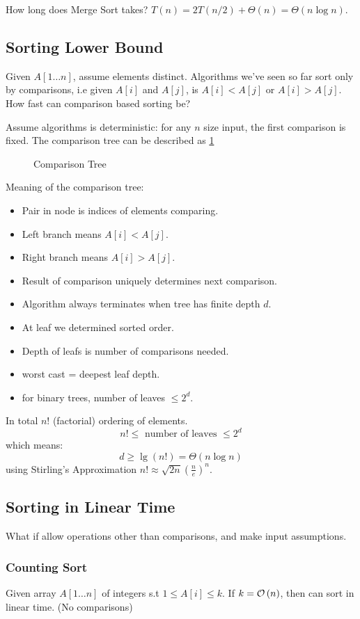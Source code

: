 How long does Merge Sort takes?
$T(n) = 2T(n/2) + \Theta(n) = \Theta(n \log n)$.

\subsection{Sorting Lower Bound}
Given $A[1 \ldots n]$, assume elements distinct.
Algorithms we've seen so far sort only by comparisons,
i.e given $A[i]$ and $A[j]$, is $A[i] < A[j]$ or $A[i] > A[j]$.
How fast can comparison based sorting be?

Assume algorithms is deterministic: for any $n$ size input,
the first comparison is fixed.
The comparison tree can be described as \cref{fig:sortinglowerbound}

\begin{figure}[H]
    \caption{Comparison Tree}\label{fig:sortinglowerbound}
\end{figure}

Meaning of the comparison tree:
\begin{itemize}
    \item Pair in node is indices of elements comparing.
    \item Left branch means $A[i] < A[j]$.
    \item Right branch means $A[i] > A[j]$.
    \item Result of comparison uniquely determines next comparison.
    \item Algorithm always terminates when tree has finite depth $d$.
    \item At leaf we determined sorted order.
    \item Depth of leafs is number of comparisons needed.
    \item worst cast = deepest leaf depth.
    \item for binary trees, number of leaves $\leq 2^d$.
\end{itemize}
In total $n!$ (factorial) ordering of elements.
\[n! \leq \text{ number of leaves } \leq 2^d\]
which means:
\[d \geq \lg(n!) = \Theta(n \log n)\]
using Stirling's Approximation $n! \approx \sqrt{2n}\left(\frac{n}{e}\right)^n$.

\subsection{Sorting in Linear Time}
What if allow operations other than comparisons,
and make input assumptions.

\subsubsection{Counting Sort}
Given array $A[1 \ldots n]$ of integers s.t $1 \leq A[i] \leq k$.
If $k = \mathcal{O}\left(n\right)$, then can sort in linear time. (No comparisons)

